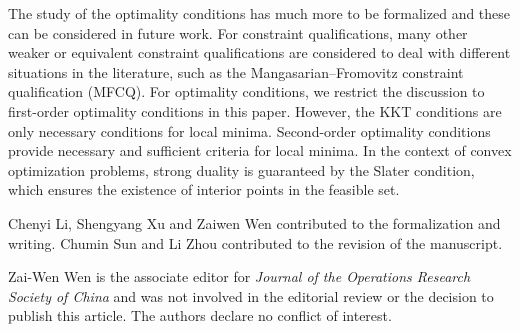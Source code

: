 \documentclass[sn-mathphys]{JORSC-jnl}%
\theoremstyle{thmstyleone}%
\theoremstyle{thmstylethree}%
\begin{document}
The study of the optimality conditions has much more to be formalized and these can be considered in future work. For constraint qualifications, many other weaker or equivalent constraint qualifications are considered to deal with different situations in the literature, such as the Mangasarian–Fromovitz constraint qualification (MFCQ). For optimality conditions, we restrict the discussion to first-order optimality conditions in this paper. However, the KKT conditions are only necessary conditions for local minima. Second-order optimality conditions provide necessary and sufficient criteria for local minima. In the context of convex optimization problems, strong duality is guaranteed by the Slater condition, which ensures the existence of interior points in the feasible set.


Chenyi Li, Shengyang Xu and Zaiwen Wen contributed to the formalization and writing. Chumin Sun and Li Zhou contributed to the  revision of the manuscript.


Zai-Wen Wen is the associate editor for \textit{Journal of the Operations Research Society of China} and was not involved in the editorial review or the decision to publish this article. The authors declare no conflict of interest.


% 
\end{document}
